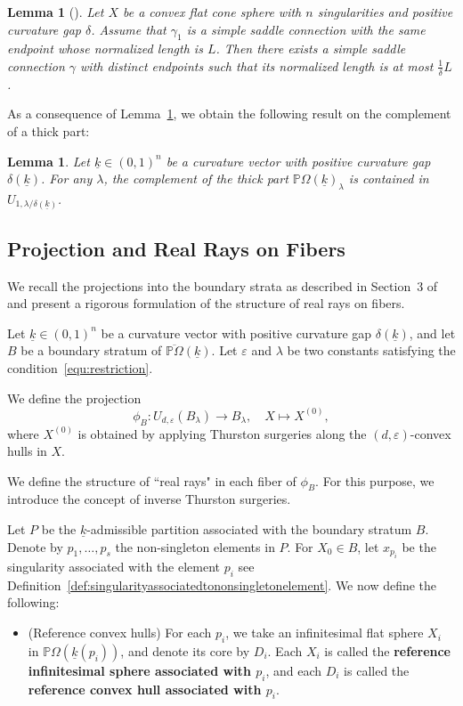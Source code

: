 \documentclass{compositio}
\numberwithin{equation}{section}
\numberwithin{figure}{section}
\theoremstyle{definition}
\theoremstyle{plain}
\newtheorem{lemma}[definition]{Lemma}
\begin{document}
{\begin{lemma}[{\cite[Lemma~4.16]{fu2024uniformlengthestimatestrajectories}}]\label{lem:closedtosimple}
    Let $X$ be a convex flat cone sphere with $n$ singularities and positive curvature gap $\delta$. Assume that $\gamma_1$ is a simple saddle connection with the same endpoint whose normalized length is $L$. Then there exists a simple saddle connection $\gamma$ with distinct endpoints such that its normalized length is at most $\frac{1}{\delta}L$. 
\end{lemma}

As a consequence of Lemma~\ref{lem:closedtosimple}, we obtain the following result on the complement of a thick part:

\begin{lemma}\label{lem:complementofthick}
    Let $\underline{k}\in(0,1)^n$ be a curvature vector with positive curvature gap $\delta(\underline{k})$. For any $\lambda$, the complement of the thick part $\mathbb{P}\Omega(\underline{k})_{\lambda}$ is contained in $U_{1,\lambda/\delta(\underline{k})}$.
\end{lemma}


\subsection{Projection and Real Rays on Fibers}
We recall the projections into the boundary strata as described in Section~3 of~\cite{thu} and present a rigorous formulation of the structure of real rays on fibers.

Let $\underline{k}\in(0,1)^n$ be a curvature vector with positive curvature gap $\delta(\underline{k})$, and let $B$ be a boundary stratum of $\overline{\mathbb{P}\Omega}(\underline{k})$. Let $\varepsilon$ and $\lambda$ be two constants satisfying the condition~\eqref{equ:restriction}.

We define the projection
\begin{equation}\label{equ:projection}
    \phi_{B}: U_{d,\varepsilon}(B_{\lambda}) \to B_{\lambda}, \quad X \mapsto X^{(0)},
\end{equation}
where $X^{(0)}$ is obtained by applying Thurston surgeries along the $(d,\varepsilon)$-convex hulls in $X$.

We define the structure of ``real rays" in each fiber of $\phi_B$. For this purpose, we introduce the concept of inverse Thurston surgeries.

Let $P$ be the $\underline{k}$-admissible partition associated with the boundary stratum $B$. Denote by $p_1, \ldots, p_s$ the non-singleton elements in $P$. For $X_0 \in B$, let $x_{p_i}$ be the singularity associated with the element $p_i$ see Definition~\ref{def:singularityassociatedtononsingletonelement}. We now define the following:
\begin{itemize}
    \item (Reference convex hulls) For each $p_i$, we take an infinitesimal flat sphere $X_i$ in $\mathbb{P}\Omega(\underline{k}(p_i))$, and denote its core by $D_i$. Each $X_i$ is called the \textbf{reference infinitesimal sphere associated with $p_i$}, and each $D_i$ is called the \textbf{reference convex hull associated with $p_i$}.
    

\end{itemize}}
\end{document}
